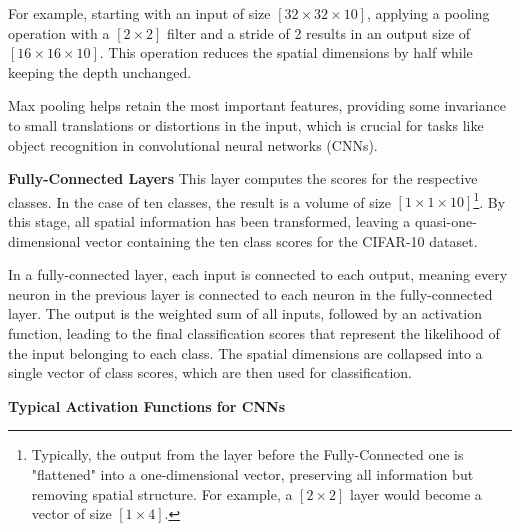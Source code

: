 For example, starting with an input of size $[32 \times 32 \times 10]$, applying a pooling operation with a $[2 \times 2]$ filter and a stride of 2 results in an output size of $[16 \times 16 \times 10]$. This operation reduces the spatial dimensions by half while keeping the depth unchanged.

Max pooling helps retain the most important features, providing some invariance to small translations or distortions in the input, which is crucial for tasks like object recognition in convolutional neural networks (CNNs).


\vspace{1em}

\textbf{Fully-Connected Layers}\label{theoretical_classification_fully_connected_layers}
This layer computes the scores for the respective classes. In the case of ten classes, the result is a volume of size $[1 \times 1 \times 10]$\footnote{Typically, the output from the layer before the Fully-Connected one is "flattened" into a one-dimensional vector, preserving all information but removing spatial structure. For example, a $[2 \times 2]$ layer would become a vector of size $[1 \times 4]$.}. By this stage, all spatial information has been transformed, leaving a quasi-one-dimensional vector containing the ten class scores for the CIFAR-10 dataset.

In a fully-connected layer, each input is connected to each output, meaning every neuron in the previous layer is connected to each neuron in the fully-connected layer. The output is the weighted sum of all inputs, followed by an activation function, leading to the final classification scores that represent the likelihood of the input belonging to each class. The spatial dimensions are collapsed into a single vector of class scores, which are then used for classification.

\textbf{Typical Activation Functions for CNNs}


